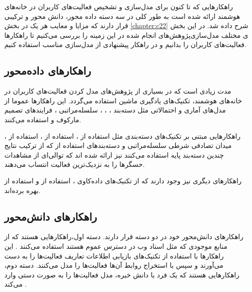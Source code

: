 راهکارهایی که تا کنون برای مدل‌سازی و تشخیص فعالیت‌های کاربران در خانه‌های هوشمند ارائه شده است به طور کلی در سه دسته داده محور، دانش محور و ترکیبی قرار دارند که مزایا و معایب هر یک در بخش \ref{chapter:c22} شرح داده شد. در این بخش پژوهش‌های انجام شده در این زمینه را بررسی می‌کنیم تا راهکارها‎ی مختلف مدل‌سازی فعالیت‌های کاربران را بدانیم و در راهکار پیشنهادی از مدل‌سازی مناسب استفاده کنیم.

\subsection{راهکارهای داده‌محور}

مدت زیادی است که در بسیاری از پژوهش‌های مدل کردن قعالیت‌های کاربران در خانه‌های هوشمند، تکنیک‌های یادگیری ماشین استفاده می‌گردد. این راهکارها عموما از مدل‌های آماری و احتمالاتی مثل دسته‌بند  \cite{x3211}،  \cite{x3212,x3213}،  \cite{x3214,x3215,x3216}،  سلسله‌مراتبی \cite{x3217}، فرایندهای تصمیم مارکوف  \cite{x3218} و  \cite{x3219} استفاده می‌کنند.

راهکارهایی مبتنی بر تکنیک‌های دسته‌بندی مثل استفاده از  \cite{x321a}، استفاده از  \cite{x321b}، استفاده از  \cite{x321c}، میدان تصادفی شرطی سلسله‌مراتبی \cite{x321d} و دسته‌بندهای استفاده از  که از ترکیب نتایج چندین دسته‌بند پایه استفاده می‌کنند \cite{x321e} نیز ارائه شده اند که توالی‌ای از مشاهدات حسگرها را به نزدیک‌ترین فعالیت انتساب می‌دهند.

راهکارهای دیگری نیز وجود دارند که از تکنیک‌های داده‌کاوی \cite{x321f}، استفاده از  \cite{x321g,x321h} و استفاده از \cite{x321i} بهره برده‌اند.

\subsection{راهکارهای دانش‌محور}

راهکارهای دانش‌محور خود در دو دسته قرار دارند. دسته اول،راهکارهایی هستند که از منابع موجودی که مثل اسناد وب در دسترس عموم هستند استفاده می‌کنند \cite{x3221,x3222,x3223}. این راهکارها با استفاده از تکنیک‌های بازیابی اطلاعات تعاریف فعالیت‌ها را به دست می‌آورند و سپس با استخراج روابط آن‌ها فعالیت‌ها را مدل می‌کنند. دسته دوم، راهکارهایی هستند که یک فرد با دانش خبره، مدل‌ فعالیت‌ها را به صورت دستی وارد می‌کند \cite{x3224,x3225,x3226,x3227}.

